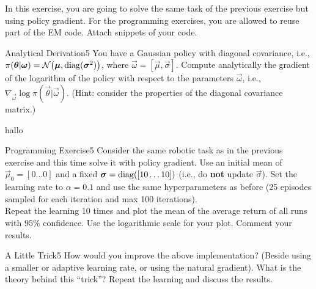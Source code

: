 In this exercise, you are going to solve the same task of the previous exercise but using policy gradient. 
For the programming exercises, you are allowed to reuse part of the EM code. 
Attach snippets of your code.

\begin{questions}


\begin{question}{Analytical Derivation}{5}
 	You have a Gaussian policy with diagonal covariance, i.e., $\pi({\boldsymbol{\theta}} | {\boldsymbol{\omega}}) = \mathcal{N}\big({\boldsymbol{\mu}}, \operatorname{\mathrm{diag}}({\boldsymbol{\sigma}}^2)\big)$, where $\vec \omega = [\vec \mu,\vec \sigma]$.
 	Compute analytically the gradient of the logarithm of the policy with respect to the parameters $\vec\omega$, i.e., $\nabla_{\vec\omega} \log \pi(\vec \theta | \vec \omega)$. (Hint: consider the properties of the diagonal covariance matrix.)
 	
 	\begin{answer}
		hallo
	\end{answer}

\end{question}


\begin{question}{Programming Exercise}{5}
	Consider the same robotic task as in the previous exercise and this time solve it with policy gradient. 
	Use an initial mean of $\vec \mu_0 = [0 \dots 0]$ and a fixed ${\boldsymbol{\sigma}} = \operatorname{\mathrm{diag}}([10 \dots 10])$ (i.e., do \textbf{not} update $\vec\sigma$). Set the learning rate to $\alpha=0.1$ and use the same hyperparameters as before (25 episodes sampled for each iteration and max 100 iterations).\\
	Repeat the learning 10 times and plot the mean of the average return of all runs with $95\%$ confidence.
	Use the logarithmic scale for your plot. Comment your results.
	
	\begin{answer}

	\end{answer}
\end{question}




\begin{question}{A Little Trick}{5}
	How would you improve the above implementation? (Beside using a smaller or adaptive learning rate, or using the natural gradient). What is the theory behind this ``trick''? Repeat the learning and discuss the results.
	

\end{question}
\end{questions}
